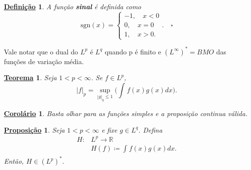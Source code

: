 \documentclass{article}
\newtheorem*{def*}{\underline{Defini\c c\~ao}}
\newtheorem*{theorem*}{\underline{Teorema}}
\newtheorem*{prop*}{\underline{Proposi\c c\~ao}}
\newtheorem*{crl*}{\underline{Corolário}}
\begin{document}
 \begin{def*}
   A função \textbf{sinal} é definida como 
   \[
   \mathrm{sgn}(x)  = \left\{\begin{array}{ll}
       -1,\quad x < 0\\ 
       0,\quad x = 0\\ 
       1,\quad x > 0.
     \end{array}\right..\quad \square
 \]
 \end{def*}
  Vale notar que o dual do \(L^{p}\) é \(L^{q}\) quando p é finito e \((L^{\infty})^{*} = BMO\) das funções de variação média.
 \begin{theorem*}
   Seja \(1< p < \infty\). Se \(f\in L^{p}\), 
     \[
       |f|_{p}=\sup_{|g|_{q}\leq 1}\biggl(\int_{}^{}f(x)g(x)dx\biggr).
     \]
 \end{theorem*}
 \begin{crl*}
   Basta olhar para as funções simples e a proposição continua válida.
 \end{crl*}
\begin{prop*}
  Seja \(1 < p < \infty\) e fixe \(g\in L^{q}\). Defina 
 \begin{align*}
   H:&L^{p}\rightarrow \mathbb{R}\\ 
     &H(f)\coloneqq \int_{}^{}f(x)g(x)dx.
 \end{align*}
 Então, \(H\in (L^{p})^{*}.\)
\end{prop*}

\end{document}
